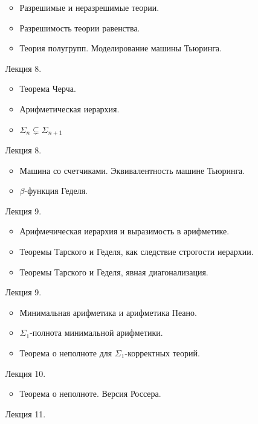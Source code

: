 \begin{enumerate}
        \begin{itemize}
            \item Разрешимые и неразрешимые теории.
            \item Разрешимость теории равенства.
            \item Теория полугрупп. Моделирование машины Тьюринга.
        \end{itemize}
    \item[Лекция 8.]
        \begin{itemize}
            \item Теорема Черча.
            \item Арифметическая иерархия. 
            \item $\Sigma_{n} \subsetneq \Sigma_{n + 1}$
        \end{itemize}
    \item[Лекция 8.]
        \begin{itemize}
            \item Машина со счетчиками. Эквивалентность машине Тьюринга.
            \item $\beta$-функция Геделя.
        \end{itemize}
    \item[Лекция 9.]
        \begin{itemize}
            \item Арифмечическая иерархия и выразимость в арифметике.
            \item Теоремы Тарского и Геделя, как следствие строгости иерархии.
            \item Теоремы Тарского и Геделя, явная диагонализация.
        \end{itemize}
    \item[Лекция 9.]
        \begin{itemize}
            \item Минимальная арифметика и арифметика Пеано.
            \item $\Sigma_1$-полнота минимальной арифметики.
            \item Теорема о неполноте для $\Sigma_1$-корректных теорий.
        \end{itemize}
    \item[Лекция 10.]
        \begin{itemize}
            \item Теорема о неполноте. Версия Россера.
        \end{itemize}
    \item[Лекция 11.]

\end{enumerate}
